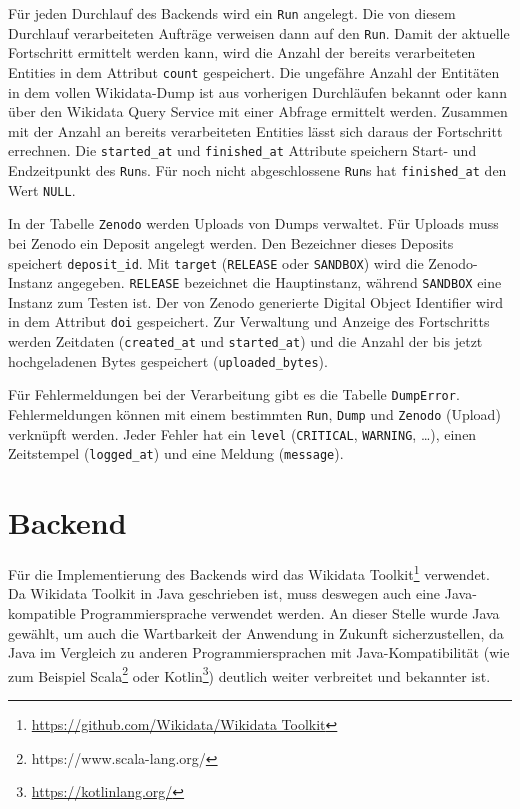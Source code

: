 Für jeden Durchlauf des Backends wird ein \verb|Run| angelegt.
Die von diesem Durchlauf verarbeiteten Aufträge verweisen dann auf den \verb|Run|.
Damit der aktuelle Fortschritt ermittelt werden kann, wird die Anzahl der bereits verarbeiteten Entities in dem Attribut \verb|count| gespeichert.
Die ungefähre Anzahl der Entitäten in dem vollen Wikidata-Dump ist aus vorherigen Durchläufen bekannt oder kann über den Wikidata Query Service mit einer Abfrage ermittelt werden.
Zusammen mit der Anzahl an bereits verarbeiteten Entities lässt sich daraus der Fortschritt errechnen.
Die \verb|started_at| und \verb|finished_at| Attribute speichern Start- und Endzeitpunkt des \verb|Run|s.
Für noch nicht abgeschlossene \verb|Run|s hat \verb|finished_at| den Wert \verb|NULL|.

In der Tabelle \verb|Zenodo| werden Uploads von Dumps verwaltet.
Für Uploads muss bei Zenodo ein Deposit angelegt werden.
Den Bezeichner dieses Deposits speichert \verb|deposit_id|.
Mit \verb|target| (\verb|RELEASE| oder \verb|SANDBOX|) wird die Zenodo-Instanz angegeben.
\verb|RELEASE| bezeichnet die Hauptinstanz, während \verb|SANDBOX| eine Instanz zum Testen ist.
Der von Zenodo generierte Digital Object Identifier wird in dem Attribut \verb|doi| gespeichert.
Zur Verwaltung und Anzeige des Fortschritts werden Zeitdaten (\verb|created_at| und \verb|started_at|) und die Anzahl der bis jetzt hochgeladenen Bytes gespeichert (\verb|uploaded_bytes|). 

Für Fehlermeldungen bei der Verarbeitung gibt es die Tabelle \verb|DumpError|. 
Fehlermeldungen können mit einem bestimmten \verb|Run|, \verb|Dump| und \verb|Zenodo| (Upload) verknüpft werden.
Jeder Fehler hat ein \verb|level| (\verb|CRITICAL|, \verb|WARNING|, \ldots), einen Zeitstempel (\verb|logged_at|) und eine Meldung (\verb|message|).

\section{Backend}
Für die Implementierung des Backends wird das Wikidata Toolkit\footnote{\url{https://github.com/Wikidata/Wikidata Toolkit}} verwendet.
Da Wikidata Toolkit in Java geschrieben ist, muss deswegen auch eine Java-kompatible Programmiersprache verwendet werden.
An dieser Stelle wurde Java gewählt, um auch die Wartbarkeit der Anwendung in Zukunft sicherzustellen, da Java im Vergleich zu anderen Programmiersprachen mit Java-Kompatibilität (wie zum Beispiel Scala\footnote{https://www.scala-lang.org/} oder Kotlin\footnote{\url{https://kotlinlang.org/}}) deutlich weiter verbreitet und bekannter ist.

